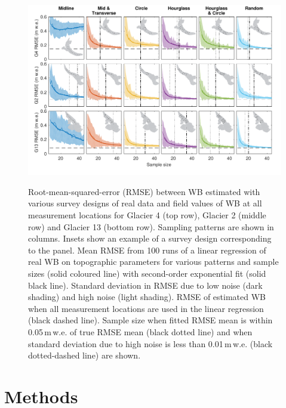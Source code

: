 \documentclass[twocolumn,letterpaper]{igs}
\begin{document}
\begin{figure}
	\centering
	\includegraphics[width =\textwidth]{DataObsWB.pdf}\\
	\caption{Root-mean-squared-error (RMSE) between WB estimated with various survey designs of real data and field values of WB at all measurement locations for Glacier 4 (top row), Glacier 2 (middle row) and Glacier 13 (bottom row). Sampling patterns are shown in columns. Insets show an example of a survey design corresponding to the panel. Mean RMSE from 100 runs of a linear regression of real WB on topographic parameters for various patterns and sample sizes (solid coloured line) with second-order exponential fit (solid black line). Standard deviation in RMSE due to low noise (dark shading) and high noise (light shading). RMSE of estimated WB when all measurement locations are used in the linear regression (black dashed line). Sample size when fitted RMSE mean is within 0.05\,m\,w.e. of true RMSE mean (black dotted line) and when standard deviation due to high noise is less than 0.01\,m\,w.e. (black dotted-dashed line) are shown.}
	\label{fig:RealObsWB}
\end{figure}


\section{Methods}
\end{document}
